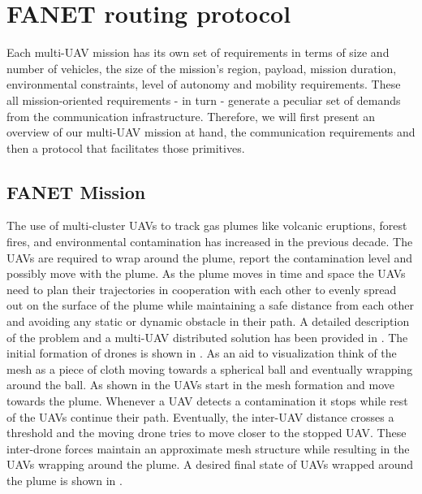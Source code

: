 \chapter{FANET routing protocol}
Each multi-UAV mission has its own set of requirements in terms of size and number of vehicles, the size of the mission's region, payload, mission duration, environmental constraints, level of autonomy and mobility requirements. These all mission-oriented requirements - in turn - generate a peculiar set of demands from the communication infrastructure. Therefore, we will first present an overview of our multi-UAV mission at hand, the communication requirements and then a protocol that facilitates those primitives.

\section{FANET Mission}

The use of multi-cluster UAVs to track gas plumes like volcanic eruptions, forest fires, and environmental contamination has increased in the previous decade. The UAVs are required to wrap around the plume, report the contamination level and possibly move with the plume. As the plume moves in time and space the UAVs need to plan their trajectories in cooperation with each other to evenly spread out on the surface of the plume while maintaining a safe distance from each other and avoiding any static or dynamic obstacle in their path. A detailed description of the problem and a multi-UAV distributed solution has been provided in \cite{8080382}. The initial formation of drones is shown in . As an aid to visualization think of the mesh as a piece of cloth moving towards a spherical ball and eventually wrapping around the ball. As shown in  the UAVs start in the mesh formation and move towards the plume. Whenever a UAV detects a contamination it stops while rest of the UAVs continue their path. Eventually, the inter-UAV distance crosses a threshold and the moving drone tries to move closer to the stopped UAV. These inter-drone forces maintain an approximate mesh structure while resulting in the UAVs wrapping around the plume. A desired final state of UAVs wrapped around the plume is shown in .  

